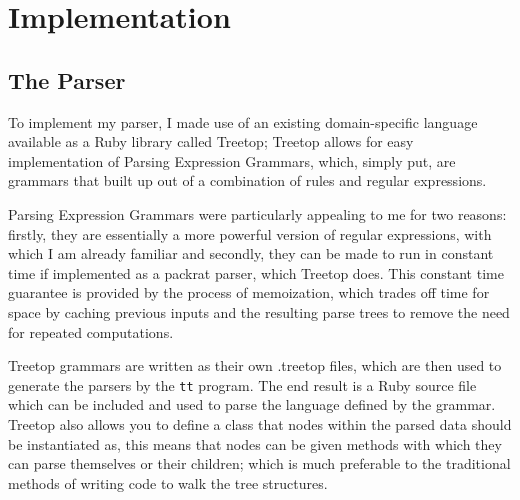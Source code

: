 



\chapter{Implementation}

\section{The Parser}
To implement my parser, I made use of an existing domain-specific language
available as a Ruby library called Treetop\cite{website:treetop}; Treetop allows
for easy implementation of Parsing Expression Grammars, which, simply put, are
grammars that built up out of a combination of rules and regular expressions.

Parsing Expression Grammars were particularly appealing to me for two reasons:
firstly, they are essentially a more powerful version of regular expressions,
with which I am already familiar and secondly, they can be made to run in
constant time if implemented as a packrat parser, which Treetop does. This
constant time guarantee is provided by the process of memoization, which trades
off time for space by caching previous inputs and the resulting parse trees to
remove the need for repeated computations.

Treetop grammars are written as their own .treetop files, which are then used
to generate the parsers by the \lstinline|tt| program. The end result is a Ruby
source file which can be included and used to parse the language defined by the
grammar. Treetop also allows you to define a class that nodes within the parsed
data should be instantiated as, this means that nodes can be given methods with
which they can parse themselves or their children; which is much preferable to
the traditional methods of writing code to walk the tree structures.

